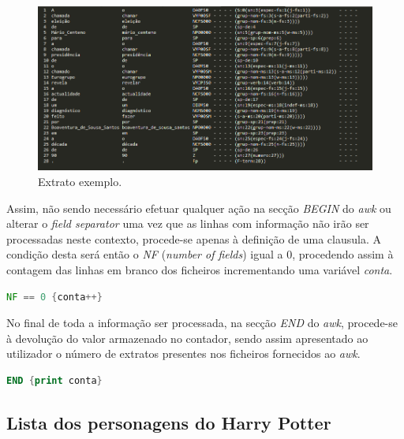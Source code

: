 \documentclass[a4paper]{article}
\begin{document}
\begin{figure}[!h]
    \centering
    \includegraphics[width=14cm]{extrato.png}
    \caption{Extrato exemplo.}
    \label{fig:ext}
\end{figure}

\par Assim, não sendo necessário efetuar qualquer ação na secção \textit{BEGIN} do \emph{awk} ou alterar o \emph{field separator} uma vez que as linhas com informação não irão ser processadas neste contexto, procede-se apenas à definição de uma clausula. A condição desta será então o \textit{NF} (\emph{number of fields}) igual a 0, procedendo assim à contagem das linhas em branco dos ficheiros incrementando uma variável \emph{conta}.

\begin{lstlisting}[language=Awk, caption=Condição de contagem de um extrato e respetiva ação tomada.]
	NF == 0 {conta++}
\end{lstlisting}

\par No final de toda a informação ser processada, na secção \textit{END} do \emph{awk}, procede-se à devolução do valor armazenado no contador, sendo assim apresentado ao utilizador o número de extratos presentes nos ficheiros fornecidos ao \emph{awk}.

\begin{lstlisting}[language=Awk, caption=Devolução do resultado obtido.]
	END {print conta}
\end{lstlisting}


\subsection{Lista dos personagens do Harry Potter}
\end{document}
